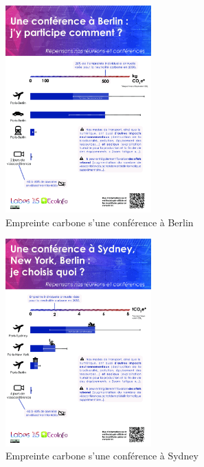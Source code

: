 \begin{figure}[H]
    \centering
    \includegraphics[width=0.5\textwidth]{images/berlin_v7_fr.png}
    \caption{Empreinte carbone s'une conférence à Berlin}
    \label{fig:berlin}
\end{figure}

\begin{figure}[H]
    \centering
    \includegraphics[width=0.5\textwidth]{images/sydney_v7_fr.png}
    \caption{Empreinte carbone s'une conférence à Sydney}
    \label{fig:sydney}
\end{figure}

\newpage

